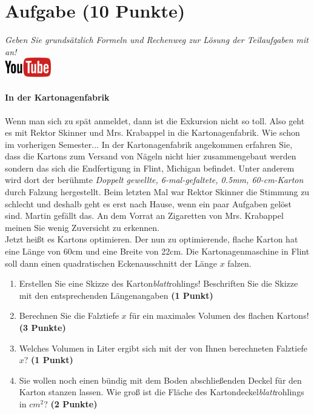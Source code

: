 \documentclass[a4paper, 9pt]{scrartcl}\usepackage[]{graphicx}\usepackage[]{xcolor}
\begin{document}
\section{Aufgabe \hfill (10 Punkte)}

\textit{Geben Sie grunds{\"a}tzlich Formeln und Rechenweg zur L{\"o}sung der
  Teilaufgaben mit an!} \\[1Ex]

\hfill\href{https://youtu.be/RuzMjwvwT-4}{\includegraphics[width =
  2cm]{img/youtube}} %
\hspace{2Ex}

\paragraph{In der Kartonagenfabrik}



Wenn man sich zu sp{\"a}t anmeldet, dann ist die Exkursion nicht so toll. Also
geht es mit Rektor Skinner und Mrs. Krabappel in die Kartonagenfabrik. Wie
schon im vorherigen Semester... In der Kartonagenfabrik angekommen erfahren
Sie, dass die Kartons zum Versand von N{\"a}geln nicht hier zusammengebaut
werden sondern das sich die Endfertigung in Flint, Michigan befindet. Unter
anderem wird dort der ber{\"u}hmte \textit{Doppelt gewellte,
  6-mal-gefaltete, 0.5mm, 60-cm-Karton} durch
Falzung hergestellt. Beim letzten Mal war Rektor Skinner die Stimmung zu
schlecht und deshalb geht es erst nach Hause, wenn ein paar Aufgaben gel{\"o}st
sind. Martin gef{\"a}llt das. An dem Vorrat
an Zigaretten von Mrs. Krabappel meinen Sie wenig Zuversicht zu erkennen.\\

Jetzt hei{\ss}t es Kartons optimieren. Der nun zu optimierende, flache Karton
hat eine L{\"a}nge von 60cm und eine Breite von 22cm. Die
Kartonagenmaschine in Flint soll dann einen quadratischen Eckenausschnitt
der L{\"a}nge $x$ falzen.

\begin{enumerate}
\item Erstellen Sie eine Skizze des Karton\textit{blatt}rohlings!
  Beschriften Sie die Skizze mit den entsprechenden L{\"a}ngenangaben
  \textbf{(1 Punkt)}
\item Berechnen Sie die Falztiefe $x$ f{\"u}r ein maximales Volumen des flachen
  Kartons! \textbf{(3 Punkte)}
\item Welches Volumen in Liter ergibt sich mit der von Ihnen berechneten
  Falztiefe $x$?  \textbf{(1 Punkt)}
\item Sie wollen noch einen b{\"u}ndig mit dem Boden abschlie{\ss}enden Deckel f{\"u}r
  den Karton stanzen lassen. Wie gro{\ss} ist die Fl{\"a}che des
  Kartondeckel\textit{blatt}rohlings in $cm^2$? \textbf{(2 Punkte)}
\end{enumerate}
\end{document}
